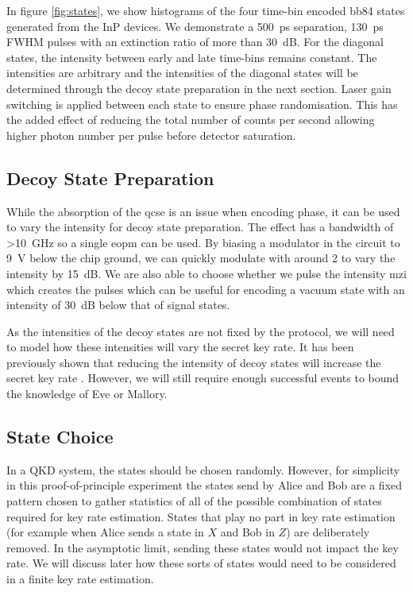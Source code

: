 In figure \ref{fig:states}, we show histograms of the four time-bin encoded \ac{bb84} states generated from the \ac{InP} devices. We demonstrate a \SI{500}{ps} separation, \SI{130}{ps} \ac{FWHM} pulses with an extinction ratio of more than \SI{30}{dB}. For the diagonal states, the intensity between early and late time-bins remains constant. The intensities are arbitrary and the intensities of the diagonal states will be determined through the decoy state preparation in the next section. Laser gain switching is applied between each state to ensure phase randomisation. This has the added effect of reducing the total number of counts per second allowing higher photon number per pulse before detector saturation.

\subsection{Decoy State Preparation}

While the absorption of the \ac{qcse} is an issue when encoding phase, it can be used to vary the intensity for decoy state preparation. The effect has a bandwidth of \SI{>10}{\GHz} so a single \ac{eopm} can be used. By biasing a modulator in the circuit to \SI{9}{\V} below the chip ground, we can quickly modulate with around \SI{2}{\Vpp} to vary the intensity by \SI{15}{dB}. We are also able to choose whether we pulse the intensity \ac{mzi} which creates the pulses which can be useful for encoding a vacuum state with an intensity of \SI{30}{dB} below that of signal states.

As the intensities of the decoy states are not fixed by the protocol, we will need to model how these intensities will vary the secret key rate. It has been previously shown that reducing the intensity of decoy states will increase the secret key rate \cite{Chan2014}. However, we will still require enough successful events to bound the knowledge of Eve or Mallory.

\subsection{State Choice}

In a \ac{QKD} system, the states should be chosen randomly. However, for simplicity in this proof-of-principle experiment the states send by Alice and Bob are a fixed pattern chosen to gather statistics of all of the possible combination of states required for key rate estimation. States that play no part in key rate estimation (for example when Alice sends a state in $X$ and Bob in $Z$) are deliberately removed. In the asymptotic limit, sending these states would not impact the key rate. We will discuss later how these sorts of states would need to be considered in a finite key rate estimation.

